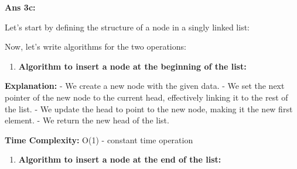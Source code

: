 \textbf{Ans 3c:}

Let's start by defining the structure of a node in a singly linked list:

\begin{Shaded}
\begin{Highlighting}[]
     \NormalTok{(}
        \OperatorTok{=}
         \OperatorTok{=} 
\end{Highlighting}
\end{Shaded}

Now, let's write algorithms for the two operations:

\begin{enumerate}
\def\labelenumi{\arabic{enumi}.}
\tightlist
\item
  \textbf{Algorithm to insert a node at the beginning of the list:}
\end{enumerate}

\begin{Shaded}
\begin{Highlighting}[]
\OperatorTok{=}
    
 \OperatorTok{=}
    
\OperatorTok{=}
    
\end{Highlighting}
\end{Shaded}

\textbf{Explanation:} - We create a new node with the given data. - We
set the next pointer of the new node to the current head, effectively
linking it to the rest of the list. - We update the head to point to the
new node, making it the new first element. - We return the new head of
the list.

\textbf{Time Complexity:} O(1) - constant time operation

\begin{enumerate}
\def\labelenumi{\arabic{enumi}.}
\setcounter{enumi}{1}
\tightlist
\item
  \textbf{Algorithm to insert a node at the end of the list:}
\end{enumerate}


